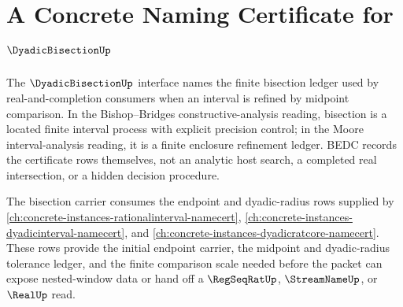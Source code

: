 \chapter{A Concrete Naming Certificate for $\DyadicBisectionUp$}
\label{ch:concrete-instances-dyadicbisection-namecert}

The $\DyadicBisectionUp$ interface names the finite bisection ledger used by real-and-completion consumers when an interval is refined by midpoint comparison. In the Bishop--Bridges constructive-analysis reading, bisection is a located finite interval process with explicit precision control; in the Moore interval-analysis reading, it is a finite enclosure refinement ledger. BEDC records the certificate rows themselves, not an analytic host search, a completed real intersection, or a hidden decision procedure.

The bisection carrier consumes the endpoint and dyadic-radius rows supplied by \autoref{ch:concrete-instances-rationalinterval-namecert}, \autoref{ch:concrete-instances-dyadicinterval-namecert}, and \autoref{ch:concrete-instances-dyadicratcore-namecert}. These rows provide the initial endpoint carrier, the midpoint and dyadic-radius tolerance ledger, and the finite comparison scale needed before the packet can expose nested-window data or hand off a $\RegSeqRatUp$, $\StreamNameUp$, or $\RealUp$ read.

